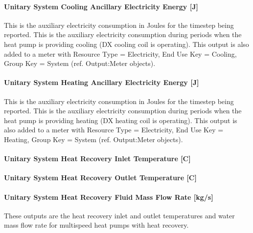 \paragraph{Unitary System Cooling Ancillary Electricity Energy {[}J{]}}\label{unitary-system-cooling-ancillary-electric-energy-j-1}

This is the auxiliary electricity consumption in Joules for the timestep being reported. This is the auxiliary electricity consumption during periods when the heat pump is providing cooling (DX cooling coil is operating). This output is also added to a meter with Resource Type = Electricity, End Use Key = Cooling, Group Key = System (ref. Output:Meter objects).

\paragraph{Unitary System Heating Ancillary Electricity Energy {[}J{]}}\label{unitary-system-heating-ancillary-electric-energy-j-1}

This is the auxiliary electricity consumption in Joules for the timestep being reported. This is the auxiliary electricity consumption during periods when the heat pump is providing heating (DX heating coil is operating). This output is also added to a meter with Resource Type = Electricity, End Use Key = Heating, Group Key = System (ref. Output:Meter objects).

\paragraph{Unitary System Heat Recovery Inlet Temperature {[}C{]}}\label{unitary-system-heat-recovery-inlet-temperature-c-1}

\paragraph{Unitary System Heat Recovery Outlet Temperature {[}C{]}}\label{unitary-system-heat-recovery-outlet-temperature-c-1}

\paragraph{Unitary System Heat Recovery Fluid Mass Flow Rate {[}kg/s{]}}\label{unitary-system-heat-recovery-fluid-mass-flow-rate-kgs-1}

These outputs are the heat recovery inlet and outlet temperatures and water mass flow rate for multispeed heat pumps with heat recovery.

